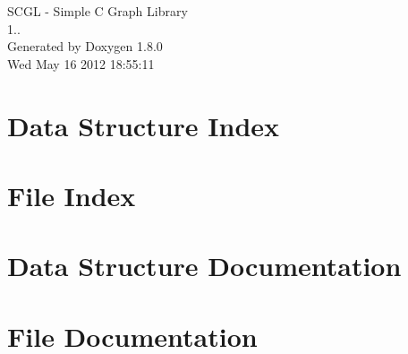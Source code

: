 \documentclass{book}
\begin{document}
\begin{titlepage}
\vspace*{7cm}
\begin{center}
{\Large S\-C\-G\-L -\/ Simple C Graph Library \\[1ex]\large 1.. }\\
\vspace*{1cm}
{\large Generated by Doxygen 1.8.0}\\
\vspace*{0.5cm}
{\small Wed May 16 2012 18:55:11}\\
\end{center}
\end{titlepage}
\clearemptydoublepage
{}
\tableofcontents
\clearemptydoublepage
{}
\chapter{Data Structure Index}

\chapter{File Index}

\chapter{Data Structure Documentation}




\chapter{File Documentation}







\printindex
\end{document}
